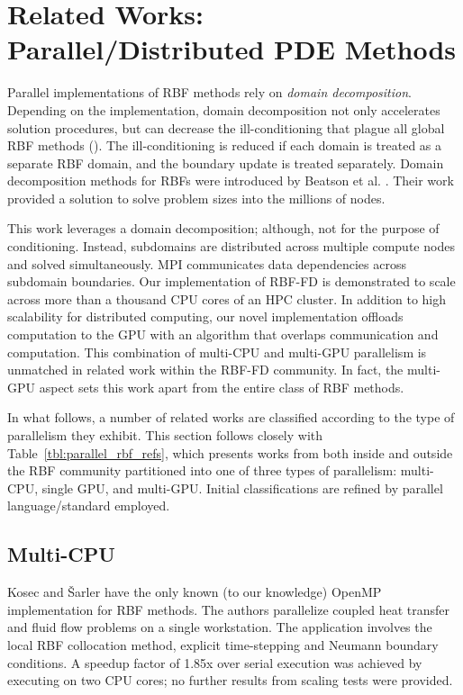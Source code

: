 \documentclass[11pt]{report}
\begin{document}
\section{Related Works: Parallel/Distributed PDE Methods} 


Parallel implementations of RBF methods rely on \emph{domain decomposition}. Depending on the implementation, domain decomposition not only accelerates solution procedures, but can decrease the ill-conditioning that plague all global RBF methods (\cite{Divo2007}). The ill-conditioning is reduced if each domain is treated as a separate RBF domain, and the boundary update is treated separately. Domain decomposition methods for RBFs were introduced by Beatson et al. \cite{Beatson2000}. Their work provided a solution to solve problem sizes into the millions of nodes.

This work leverages a domain decomposition; although, not for the purpose of conditioning. Instead, subdomains are distributed across multiple compute nodes and solved simultaneously. MPI communicates data dependencies across subdomain boundaries. Our implementation of RBF-FD is demonstrated to scale across more than a thousand CPU cores of an HPC cluster. In addition to high scalability for distributed computing, our novel implementation offloads computation to the GPU with an algorithm that overlaps communication and computation. This combination of multi-CPU and multi-GPU parallelism is unmatched in related work within the RBF-FD community. In fact, the multi-GPU aspect sets this work apart from the entire class of RBF methods. 

In what follows, a number of related works are classified according to the type of parallelism they exhibit. This section follows closely with Table~\ref{tbl:parallel_rbf_refs}, which presents works from both inside and outside the RBF community partitioned into one of three types of parallelism: multi-CPU, single GPU, and multi-GPU. Initial classifications are refined by parallel language/standard employed. 





\subsection{Multi-CPU}

Kosec and \v{S}arler \cite{Kosec2008} have the only known (to our knowledge) OpenMP implementation for RBF methods. The authors parallelize coupled heat transfer 
and fluid flow problems on a single workstation. 
The application involves the local RBF collocation method, explicit time-stepping and Neumann boundary conditions. A speedup 
factor of 1.85x over serial execution was achieved by executing on two CPU cores; no further 
results from scaling tests were provided. 
\end{document}
